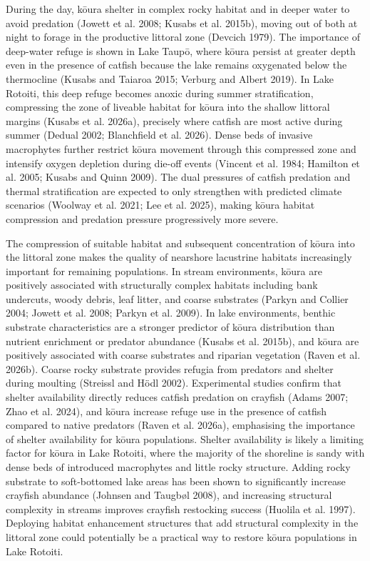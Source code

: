 \documentclass[
  12pt,
  a4paper,
  oneside]{scrbook}
\begin{document}
During the day, kōura shelter in complex rocky habitat and in deeper
water to avoid predation (Jowett et al. 2008; Kusabs et al. 2015b),
moving out of both at night to forage in the productive littoral zone
(Devcich 1979). The importance of deep-water refuge is shown in Lake
Taupō, where kōura persist at greater depth even in the presence of
catfish because the lake remains oxygenated below the thermocline
(Kusabs and Taiaroa 2015; Verburg and Albert 2019). In Lake Rotoiti,
this deep refuge becomes anoxic during summer stratification,
compressing the zone of liveable habitat for kōura into the shallow
littoral margins (Kusabs et al. 2026a), precisely where catfish are most
active during summer (Dedual 2002; Blanchfield et al. 2026). Dense beds
of invasive macrophytes further restrict kōura movement through this
compressed zone and intensify oxygen depletion during die-off events
(Vincent et al. 1984; Hamilton et al. 2005; Kusabs and Quinn 2009). The
dual pressures of catfish predation and thermal stratification are
expected to only strengthen with predicted climate scenarios (Woolway et
al. 2021; Lee et al. 2025), making kōura habitat compression and
predation pressure progressively more severe.

The compression of suitable habitat and subsequent concentration of
kōura into the littoral zone makes the quality of nearshore lacustrine
habitats increasingly important for remaining populations. In stream
environments, kōura are positively associated with structurally complex
habitats including bank undercuts, woody debris, leaf litter, and coarse
substrates (Parkyn and Collier 2004; Jowett et al. 2008; Parkyn et al.
2009). In lake environments, benthic substrate characteristics are a
stronger predictor of kōura distribution than nutrient enrichment or
predator abundance (Kusabs et al. 2015b), and kōura are positively
associated with coarse substrates and riparian vegetation (Raven et al.
2026b). Coarse rocky substrate provides refugia from predators and
shelter during moulting (Streissl and Hödl 2002). Experimental studies
confirm that shelter availability directly reduces catfish predation on
crayfish (Adams 2007; Zhao et al. 2024), and kōura increase refuge use
in the presence of catfish compared to native predators (Raven et al.
2026a), emphasising the importance of shelter availability for kōura
populations. Shelter availability is likely a limiting factor for kōura
in Lake Rotoiti, where the majority of the shoreline is sandy with dense
beds of introduced macrophytes and little rocky structure. Adding rocky
substrate to soft-bottomed lake areas has been shown to significantly
increase crayfish abundance (Johnsen and Taugbøl 2008), and increasing
structural complexity in streams improves crayfish restocking success
(Huolila et al. 1997). Deploying habitat enhancement structures that add
structural complexity in the littoral zone could potentially be a
practical way to restore kōura populations in Lake Rotoiti.
\end{document}

